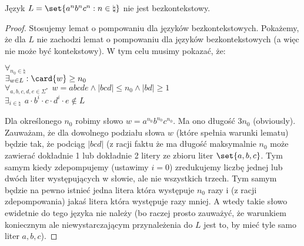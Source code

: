 \begin{theorem}
	Język \( L = \set{a^nb^nc^n : n \in \natural} \) nie jest bezkontekstowy.
\end{theorem}

\begin{proof}
	Stosujemy lemat o pompowaniu dla języków bezkontekstowych. Pokażemy, że dla \(L\) nie zachodzi lemat o pompowaniu dla języków bezkontekstowych (a więc nie może być kontekstowy). W tym celu musimy pokazać, że:

	\( \forall_{n_0 \in \natural} \) \\
	\( \exists_{w \in L} : \card{w} \geq n_0 \) \\
	\( \forall_{a, b, c, d, e \in \Sigma^*} \hspace{5pt} w = abcde \land |bcd| \leq n_0 \land |bd| \geq 1 \) \\
	\( \exists_{i \in \natural} \hspace{5pt} a \cdot b^{i} \cdot c \cdot d^{i} \cdot e \not\in L\)

	Dla określonego \(n_0\) robimy słowo \(w = a^{n_0}b^{n_0}c^{n_0}\). Ma ono długość \(3n_0\) (obviously). Zauważam, że dla dowolnego podziału słowa \(w\) (które spełnia warunki lematu) będzie tak, że podciąg \( |bcd| \) (z racji faktu że ma długość maksymalnie \(n_0\) może zawierać dokładnie 1 lub dokładnie 2 litery ze zbioru liter \( \set{a,b,c} \). Tym samym kiedy zdepompujemy (ustawimy \(i=0\)) zredukujemy liczbę jednej lub dwóch liter występujących w słowie, ale nie wszystkich trzech. Tym samym będzie na pewno istnieć jedna litera która występuje \(n_0\) razy i (z racji zdepompowania) jakaś litera która występuje razy mniej. A wtedy takie słowo ewidetnie do tego języka nie należy (bo raczej prosto zauważyć, że warunkiem koniecznym ale niewystarczającym przynależenia do \(L\) jest to, by mieć tyle samo liter \(a, b, c\)).

\end{proof}